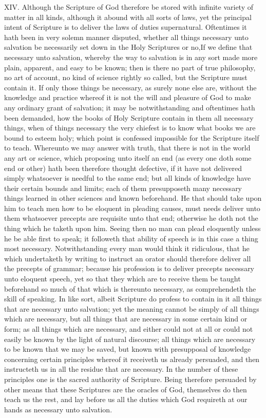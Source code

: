 XIV. Although the Scripture of God therefore be stored with infinite variety of matter in all kinds, although it abound with all sorts of laws, yet the principal intent of Scripture is to deliver the laws of duties supernatural. Oftentimes it hath been in very solemn manner disputed, whether all things necessary unto salvation be necessarily set down in the Holy Scriptures or no,If we define that necessary unto salvation, whereby the way to salvation is in any sort made more plain, apparent, and easy to be known; then is there no part of true philosophy, no art of account, no kind of science rightly so called, but the Scripture must contain it. If only those things be necessary, as surely none else are, without the knowledge and practice whereof it is not the will and pleasure of God to make any ordinary grant of salvation; it may be notwithstanding and oftentimes hath been demanded, how the books of Holy Scripture contain in them all necessary things, when of things necessary the very chiefest is to know what books we are bound to esteem holy; which point is confessed impossible for the Scripture itself to teach. Whereunto we may answer with truth, that there is not in the world any art or science, which proposing unto itself an end (as every one doth some end or other) hath been therefore thought defective, if it have not delivered simply whatsoever is needful to the same end; but all kinds of knowledge have their certain bounds and limits; each  of them presupposeth many necessary things learned in other sciences and known beforehand. He that should take upon him to teach men how to be eloquent in pleading causes, must needs deliver unto them whatsoever precepts are requisite unto that end; otherwise he doth not the thing which he taketh upon him. Seeing then no man can plead eloquently unless he be able first to speak; it followeth that ability of speech is in this case a thing most necessary. Notwithstanding every man would think it ridiculous, that he which undertaketh by writing to instruct an orator should therefore deliver all the precepts of grammar; because his profession is to deliver precepts necessary unto eloquent speech, yet so that they which are to receive them be taught beforehand so much of that which is thereunto necessary, as comprehendeth the skill of speaking. In like sort, albeit Scripture do profess to contain in it all things that are necessary unto salvation; yet the meaning cannot be simply of all things which are necessary, but all things that are necessary in some certain kind or form; as all things which are necessary, and either could not at all or could not easily be known by the light of natural discourse; all things which are necessary to be known that we may be saved, but known with presupposal of knowledge concerning certain principles whereof it receiveth us already persuaded, and then instructeth us in all the residue that are necessary. In the number of these principles one is the sacred authority of Scripture. Being therefore persuaded by other means that these Scriptures are the oracles of God, themselves do then teach us the rest, and lay before us all the duties which God requireth at our hands as necessary unto salvation.

